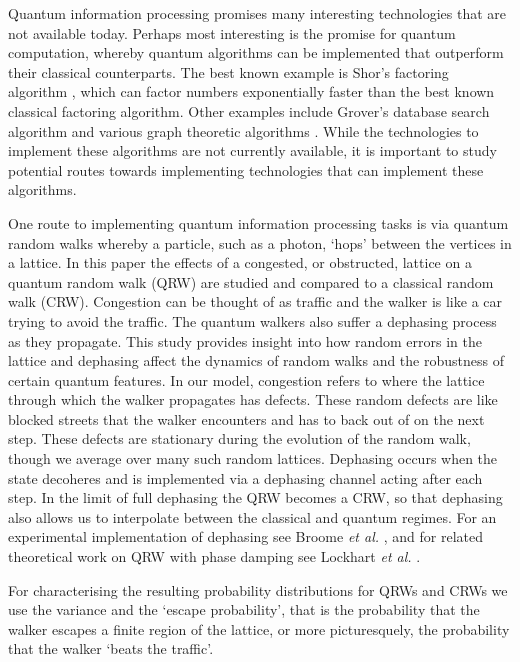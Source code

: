 \documentclass[aps,pra,twocolumn,amsmath,amssymb,nofootinbib,superscriptaddress]{revtex4}
\begin{document}
Quantum information processing \cite{bib:NielsenChuang00} promises many interesting technologies that are not available today. Perhaps most interesting is the promise for quantum computation, whereby quantum algorithms can be implemented that outperform their classical counterparts. The best known example is Shor's factoring algorithm \cite{bib:Shor97}, which can factor numbers exponentially faster than the best known classical factoring algorithm. Other examples include Grover's database search algorithm \cite{bib:Grover96} and various graph theoretic algorithms \cite{bib:Ambainis2003, PhysRevA.81.052313, PhysRevA.83.042317}. While the technologies to implement these algorithms are not currently available, it is important to study potential routes towards implementing technologies that can implement these algorithms. 

One route to implementing quantum information processing tasks is via quantum random walks \cite{bib:ADZ, bib:AAKV, bib:Kempe08, bib:Salvador12} whereby a particle, such as a photon, `hops' between the vertices in a lattice. In this paper the effects of a congested, or obstructed, lattice on a quantum random walk (QRW) are studied and compared to a classical random walk (CRW). Congestion can be thought of as traffic and the walker is like a car trying to avoid the traffic. The quantum walkers also suffer a dephasing process as they propagate. This study provides insight into how random errors in the lattice and dephasing affect the dynamics of random walks and the robustness of certain quantum features. In our model, congestion refers to where the lattice through which the walker  propagates has defects. These random defects are like blocked streets that the walker encounters and has to back out of on the next step. These defects are stationary during the evolution of the random walk, though we average over many such random lattices. Dephasing occurs when the state decoheres and is implemented via a dephasing channel acting after each step. In the limit of full dephasing the QRW becomes a CRW, so that dephasing also allows us to interpolate between the classical and quantum regimes. For an experimental implementation of dephasing see Broome \emph{et al.} \cite{bib:PhysRevLett.104.153602}, and for related theoretical work on QRW with phase damping see Lockhart \emph{et al.} \cite{bib:lockhart2013performance}.

For characterising the resulting probability distributions for QRWs and CRWs we use the variance and the `escape probability', that is the probability that the walker escapes a finite region of the lattice, or more picturesquely, the probability that the walker `beats the traffic'.
\end{document}
